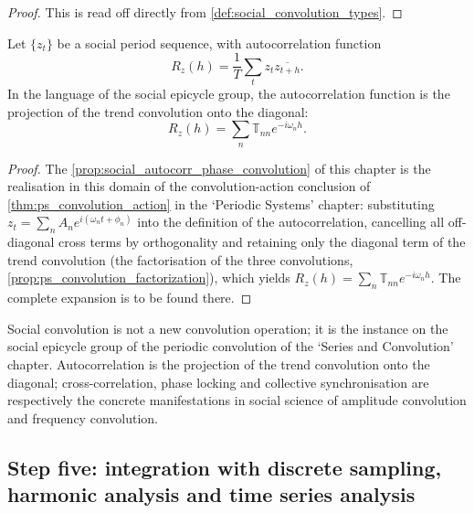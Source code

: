 \begin{proof}
This is read off directly from \cref{def:social_convolution_types}.
\end{proof}

\begin{proposition}\label{prop:social_autocorr_phase_convolution}
Let $\{z_t\}$ be a social period sequence, with autocorrelation function
\[
R_z(h)=\frac1T\sum_t z_t\overline{z_{t+h}}.
\]
In the language of the social epicycle group, the autocorrelation function is the projection of the trend convolution onto the diagonal:
\[
R_z(h)=\sum_n\mathbb T_{nn}e^{-i\omega_n h}.
\]
\end{proposition}

\begin{proof}
The \cref{prop:social_autocorr_phase_convolution} of this chapter is the realisation in this domain of the convolution-action conclusion of \cref{thm:ps_convolution_action} in the `Periodic Systems' chapter:
substituting $z_t=\sum_n A_n e^{i(\omega_n t+\phi_n)}$ into the definition of the autocorrelation, cancelling all off-diagonal cross terms by orthogonality and retaining only the diagonal term of the trend convolution
(the factorisation of the three convolutions, \cref{prop:ps_convolution_factorization}), which yields $R_z(h)=\sum_n\mathbb T_{nn}e^{-i\omega_n h}$.
The complete expansion is to be found there.
\end{proof}

\begin{remark}\label{rem:social_convolution_relation}
Social convolution is not a new convolution operation; it is the instance on the social epicycle group of the periodic convolution of the `Series and Convolution' chapter. Autocorrelation is the projection of the trend convolution onto the diagonal; cross-correlation, phase locking and collective synchronisation are respectively the concrete manifestations in social science of amplitude convolution and frequency convolution.
\end{remark}

\subsection{Step five: integration with discrete sampling, harmonic analysis and time series analysis}

